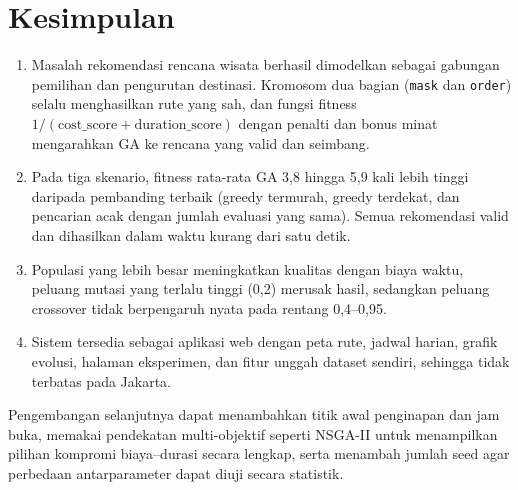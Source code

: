 \section{Kesimpulan}

\begin{enumerate}
  \item Masalah rekomendasi rencana wisata berhasil dimodelkan sebagai gabungan pemilihan dan pengurutan destinasi. Kromosom dua bagian (\texttt{mask} dan \texttt{order}) selalu menghasilkan rute yang sah, dan fungsi fitness $1/(\text{cost\_score} + \text{duration\_score})$ dengan penalti dan bonus minat mengarahkan GA ke rencana yang valid dan seimbang.
  \item Pada tiga skenario, fitness rata-rata GA 3,8 hingga 5,9 kali lebih tinggi daripada pembanding terbaik (greedy termurah, greedy terdekat, dan pencarian acak dengan jumlah evaluasi yang sama). Semua rekomendasi valid dan dihasilkan dalam waktu kurang dari satu detik.
  \item Populasi yang lebih besar meningkatkan kualitas dengan biaya waktu, peluang mutasi yang terlalu tinggi (0,2) merusak hasil, sedangkan peluang crossover tidak berpengaruh nyata pada rentang 0,4--0,95.
  \item Sistem tersedia sebagai aplikasi web dengan peta rute, jadwal harian, grafik evolusi, halaman eksperimen, dan fitur unggah dataset sendiri, sehingga tidak terbatas pada Jakarta.
\end{enumerate}

Pengembangan selanjutnya dapat menambahkan titik awal penginapan dan jam buka, memakai pendekatan multi-objektif seperti NSGA-II untuk menampilkan pilihan kompromi biaya--durasi secara lengkap, serta menambah jumlah seed agar perbedaan antarparameter dapat diuji secara statistik.
